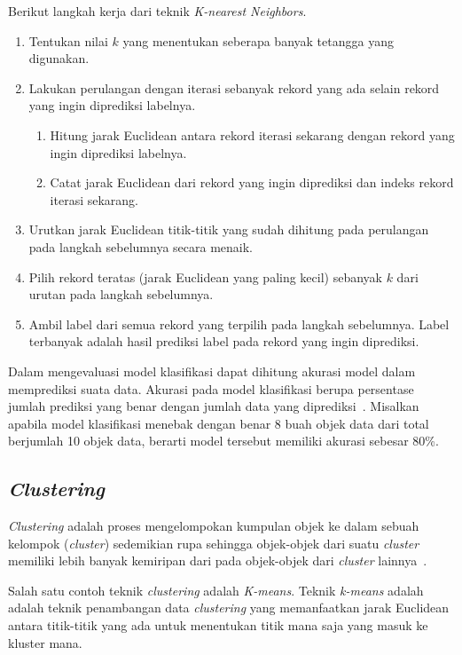 Berikut langkah kerja dari teknik \textit{K-nearest Neighbors}.
\begin{enumerate}
	\item Tentukan nilai \(k\) yang menentukan seberapa banyak tetangga yang digunakan.
	\item Lakukan perulangan dengan iterasi sebanyak rekord yang ada selain rekord yang ingin diprediksi labelnya.
	\begin{enumerate}
		\item Hitung jarak Euclidean antara rekord iterasi sekarang dengan rekord yang ingin diprediksi labelnya.
		\item Catat jarak Euclidean dari rekord yang ingin diprediksi dan indeks rekord iterasi sekarang.
	\end{enumerate}
	\item Urutkan jarak Euclidean titik-titik yang sudah dihitung pada perulangan pada langkah sebelumnya secara menaik.
	\item Pilih rekord teratas (jarak Euclidean yang paling kecil) sebanyak \(k\) dari urutan pada langkah sebelumnya.
	\item Ambil label dari semua rekord yang terpilih pada langkah sebelumnya. Label terbanyak adalah hasil prediksi label pada rekord yang ingin diprediksi.
\end{enumerate}

Dalam mengevaluasi model klasifikasi dapat dihitung akurasi model dalam memprediksi suata data. Akurasi pada model klasifikasi berupa persentase jumlah prediksi yang benar dengan jumlah data yang diprediksi~\cite{jiawei:12:datmin}. Misalkan apabila model klasifikasi menebak dengan benar 8 buah objek data dari total berjumlah 10 objek data, berarti model tersebut memiliki akurasi sebesar 80\%.

\subsection{\textit{Clustering}}
\label{subsec:clustering}

\textit{Clustering} adalah proses mengelompokan kumpulan objek ke dalam sebuah kelompok (\textit{cluster}) sedemikian rupa sehingga objek-objek dari suatu \textit{cluster} memiliki lebih banyak kemiripan dari pada objek-objek dari \textit{cluster} lainnya~\cite{mendes:17:ppdmieee}. 

Salah satu contoh teknik \textit{clustering} adalah \textit{K-means}. Teknik \textit{k-means} adalah adalah teknik penambangan data \textit{clustering} yang memanfaatkan jarak Euclidean antara titik-titik yang ada untuk menentukan titik mana saja yang masuk ke kluster mana.

